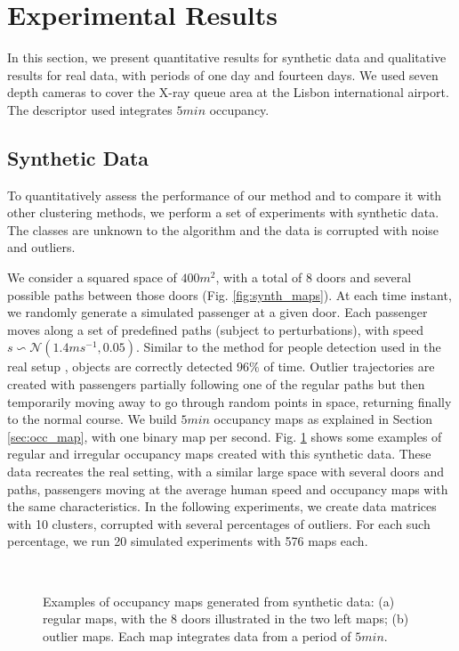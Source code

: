 \section{Experimental Results}
\label{sec:results}
In this section, we present quantitative results for synthetic data and qualitative results for real data, with periods of one day and fourteen days. %
We used seven depth cameras to cover the X-ray queue area at the Lisbon international airport. The descriptor used integrates $5min$ occupancy.
%
\subsection{Synthetic Data}
%
To quantitatively assess the performance of our method and to compare it with other clustering methods, we perform a set of experiments with synthetic data. 
The classes are unknown to the algorithm and the data is corrupted with noise and outliers.

We consider a squared space of $400m^2$, with a total of 8 doors and several possible paths between those doors (Fig. \ref{fig:synth_maps}). At each time instant, we randomly generate a simulated passenger at a given door. Each passenger moves along a set of predefined paths (subject to perturbations), with speed $s\backsim\mathcal{N}(1.4ms^{-1},0.05)$. Similar to the method for people detection used in the real setup \cite{carvalho2016detecting}, objects are correctly detected $96\%$ of time. 
Outlier trajectories are created with passengers partially following one of the regular paths but then temporarily moving away to go through random points in space, returning finally to the normal course. 
We build $5min$ occupancy maps as explained in Section \ref{sec:occ_map}, with one binary map per second.
Fig. \ref{fig:synth} shows some examples of regular and irregular occupancy maps created with this synthetic data. 
These data recreates the real setting, with a similar large space with several doors and paths, passengers moving at the average human speed and occupancy maps with the same characteristics.
In the following experiments, we create data matrices with 10 clusters, corrupted with several percentages of outliers. For each such percentage, we run 20 simulated experiments with 576 maps each. 
%
%
\begin{figure}[bht]
\centering
{}\\
\hspace{0.3mm}
\caption{Examples of occupancy maps generated from synthetic data: (a) regular maps, with the 8 doors illustrated in the two left maps; (b) outlier maps. Each map integrates data from a period of $5min$.}
\label{fig:synth}
\end{figure}
%

